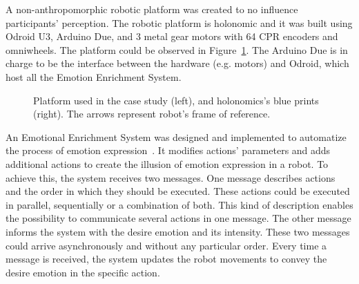 A non-anthropomorphic robotic platform was created to no influence participants' perception. The robotic platform is holonomic and it was built using Odroid U3, Arduino Due, and 3 metal gear motors with 64 CPR encoders and omniwheels. The platform could be observed in Figure~\ref{fig:Robot}. The Arduino Due is in charge to be the interface between the hardware (e.g. motors) and Odroid, which host all the Emotion Enrichment System.

\begin{figure}[t]
\centering%
\hspace{2mm}
\caption{Platform used in the case study (left), and holonomics's blue prints (right). The arrows represent robot's frame of reference.
\label{fig:Robot}}
\end{figure}

An Emotional Enrichment System was designed and implemented to automatize the process of emotion expression~\cite{Angel2017}. It modifies actions' parameters and adds additional actions to create the illusion of emotion expression in a robot. To achieve this, the system receives two messages. One message describes actions and the order in which they should be executed. These actions could be executed in parallel, sequentially or a combination of both. This kind of description enables the possibility to communicate several actions in one message. The other message informs the system with the desire emotion and its intensity. These two messages could arrive asynchronously and without any particular order. Every time a message is received, the system updates the robot movements to convey the desire emotion in the specific action.